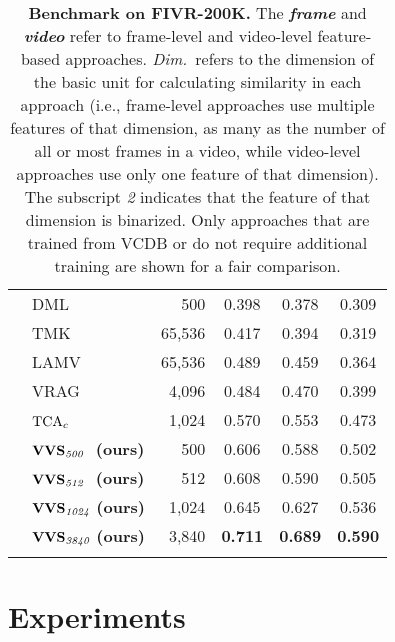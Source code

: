 \documentclass[10pt,twocolumn,letterpaper]{article}
\begin{document}
\begin{table}[!t]
\begin{center}
\begin{tabular}{@{}clrccc@{}}
             & DML~\cite{kordopatis2017near}  & 500 & 0.398 & 0.378 & \multicolumn{1}{c}{0.309}  \\ 
             & TMK~\cite{poullot2015temporal}  & 65,536 & 0.417 & 0.394 & \multicolumn{1}{c}{0.319} \\ 
             & LAMV~\cite{baraldi2018lamv}  & 65,536 & 0.489 & 0.459 & \multicolumn{1}{c}{0.364} \\
             & VRAG~\cite{ng2022vrag}  & 4,096 & 0.484 & 0.470 & \multicolumn{1}{c}{0.399} \\
             & $\textup{TCA}_{c}$~\cite{shao2021temporal}  & 1,024 & 0.570 & 0.553 & \multicolumn{1}{c}{0.473} \\ \cmidrule(l){2-6}
             & $\textbf{\textup{VVS}}_{\textit{500}}$ \,\,\textbf{(ours)} & 500 & 0.606 & 0.588 & \multicolumn{1}{c}{0.502} \\
             & $\textbf{\textup{VVS}}_{\textit{512}}$ \,\,\textbf{(ours)} & 512 & 0.608 & 0.590 & \multicolumn{1}{c}{0.505} \\
             & $\textbf{\textup{VVS}}_{\textit{1024}}$ \textbf{(ours)} & 1,024 & 0.645 & 0.627 & \multicolumn{1}{c}{0.536} \\
             & $\textbf{\textup{VVS}}_{\textit{3840}}$ \textbf{(ours)} & 3,840 & \textbf{0.711} & \textbf{0.689} & \multicolumn{1}{c}{\textbf{0.590}} \\
            \cmidrule[\heavyrulewidth]{1-6}
            \morecmidrules
            \cmidrule[\heavyrulewidth]{1-6} 
            \end{tabular} \vspace{-4mm}
        \caption{\textbf{Benchmark on FIVR-200K.} The \textit{\textbf{frame}} and \textit{\textbf{video}} refer to frame-level and video-level feature-based approaches. \textit{Dim.}~refers to the dimension of the basic unit for calculating similarity in each approach (i.e., frame-level approaches use multiple features of that dimension, as many as the number of all or most frames in a video, while video-level approaches use only one feature of that dimension). The subscript \textit{2} indicates that the feature of that dimension is binarized. Only approaches that are trained from VCDB or do not require additional training are shown for a fair comparison.} \vspace{-7mm} \label{tab:fivr}
        \end{center}
    \end{table}
    
\section{Experiments}\label{exp}
\end{document}

